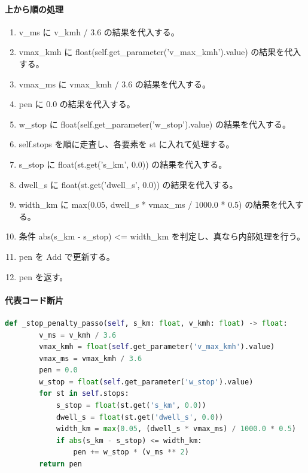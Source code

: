 \documentclass[a4paper,11pt]{article}
\begin{document}
            \paragraph{上から順の処理}
            \begin{enumerate}[leftmargin=1.8em]
            \item v\_ms に v\_kmh / 3.6 の結果を代入する。
\item vmax\_kmh に float(self.get\_parameter('v\_max\_kmh').value) の結果を代入する。
\item vmax\_ms に vmax\_kmh / 3.6 の結果を代入する。
\item pen に 0.0 の結果を代入する。
\item w\_stop に float(self.get\_parameter('w\_stop').value) の結果を代入する。
\item self.stops を順に走査し、各要素を st に入れて処理する。
\item   s\_stop に float(st.get('s\_km', 0.0)) の結果を代入する。
\item   dwell\_s に float(st.get('dwell\_s', 0.0)) の結果を代入する。
\item   width\_km に max(0.05, dwell\_s * vmax\_ms / 1000.0 * 0.5) の結果を代入する。
\item   条件 abs(s\_km - s\_stop) <= width\_km を判定し、真なら内部処理を行う。
\item     pen を Add で更新する。
\item pen を返す。
            \end{enumerate}
            \paragraph{代表コード断片}
            \begin{lstlisting}[language=Python]
    def _stop_penalty_passo(self, s_km: float, v_kmh: float) -> float:
        v_ms = v_kmh / 3.6
        vmax_kmh = float(self.get_parameter('v_max_kmh').value)
        vmax_ms = vmax_kmh / 3.6
        pen = 0.0
        w_stop = float(self.get_parameter('w_stop').value)
        for st in self.stops:
            s_stop = float(st.get('s_km', 0.0))
            dwell_s = float(st.get('dwell_s', 0.0))
            width_km = max(0.05, (dwell_s * vmax_ms) / 1000.0 * 0.5)
            if abs(s_km - s_stop) <= width_km:
                pen += w_stop * (v_ms ** 2)
        return pen
\end{lstlisting}
\end{document}
